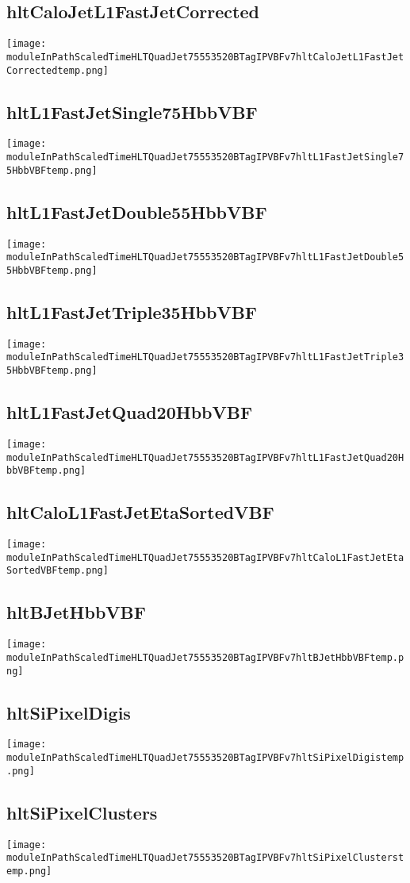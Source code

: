 \documentclass[10pt,a5paper,landscape]{report}
\begin{document}
\subsection{hltCaloJetL1FastJetCorrected} \centering \texttt{[image: moduleInPathScaledTimeHLTQuadJet75553520BTagIPVBFv7hltCaloJetL1FastJetCorrectedtemp.png]}
\subsection{hltL1FastJetSingle75HbbVBF} \centering \texttt{[image: moduleInPathScaledTimeHLTQuadJet75553520BTagIPVBFv7hltL1FastJetSingle75HbbVBFtemp.png]}
\subsection{hltL1FastJetDouble55HbbVBF} \centering \texttt{[image: moduleInPathScaledTimeHLTQuadJet75553520BTagIPVBFv7hltL1FastJetDouble55HbbVBFtemp.png]}
\subsection{hltL1FastJetTriple35HbbVBF} \centering \texttt{[image: moduleInPathScaledTimeHLTQuadJet75553520BTagIPVBFv7hltL1FastJetTriple35HbbVBFtemp.png]}
\subsection{hltL1FastJetQuad20HbbVBF} \centering \texttt{[image: moduleInPathScaledTimeHLTQuadJet75553520BTagIPVBFv7hltL1FastJetQuad20HbbVBFtemp.png]}
\subsection{hltCaloL1FastJetEtaSortedVBF} \centering \texttt{[image: moduleInPathScaledTimeHLTQuadJet75553520BTagIPVBFv7hltCaloL1FastJetEtaSortedVBFtemp.png]}
\subsection{hltBJetHbbVBF} \centering \texttt{[image: moduleInPathScaledTimeHLTQuadJet75553520BTagIPVBFv7hltBJetHbbVBFtemp.png]}
\subsection{hltSiPixelDigis} \centering \texttt{[image: moduleInPathScaledTimeHLTQuadJet75553520BTagIPVBFv7hltSiPixelDigistemp.png]}
\subsection{hltSiPixelClusters} \centering \texttt{[image: moduleInPathScaledTimeHLTQuadJet75553520BTagIPVBFv7hltSiPixelClusterstemp.png]}
\end{document}
